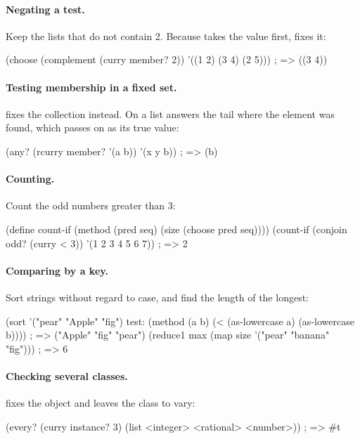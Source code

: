 \paragraph{Negating a test.} Keep the lists that do not contain 2.
Because  takes the value first,  fixes it:

\begin{dylan}
(choose (complement (curry member? 2)) '((1 2) (3 4) (2 5)))
; => ((3 4))
\end{dylan}

\paragraph{Testing membership in a fixed set.}  fixes the
collection instead. On a list  answers the tail where the
element was found, which  passes on as its true value:

\begin{dylan}
(any? (rcurry member? '(a b)) '(x y b))     ; => (b)
\end{dylan}

\paragraph{Counting.} Count the odd numbers greater than 3:

\begin{dylan}
(define count-if (method (pred seq) (size (choose pred seq))))
(count-if (conjoin odd? (curry < 3)) '(1 2 3 4 5 6 7))   ; => 2
\end{dylan}

\paragraph{Comparing by a key.} Sort strings without regard to case,
and find the length of the longest:

\begin{dylan}
(sort '("pear" "Apple" "fig")
      test: (method (a b) (< (as-lowercase a) (as-lowercase b))))
; => ("Apple" "fig" "pear")
(reduce1 max (map size '("pear" "banana" "fig")))    ; => 6
\end{dylan}

\paragraph{Checking several classes.}  fixes the object and
leaves the class to vary:

\begin{dylan}
(every? (curry instance? 3) (list <integer> <rational> <number>))   ; => #t
\end{dylan}
